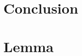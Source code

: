 \documentclass[11pt]{article}
\newcommand{\1}{\mathbf{1}}
\newcommand{\0}{\mathbf{0}}
\begin{document}

\section{Conclusion}\label{Conclusion}







{}

% 
% 














\appendix





\section{Lemma}\label{mainlemma}
\end{document}
